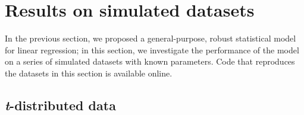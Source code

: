 \documentclass[fleqn,usenatbib]{mnras}
\begin{document}





\section{Results on simulated datasets}
\label{sec:results}

In the previous section, we proposed a general-purpose, robust statistical model
for linear regression; in this section, we investigate the performance of the
model on a series of simulated datasets with known parameters. Code that
reproduces the datasets in this section is available online\footnotemark.


\subsection{\textit{t}-distributed data}
\label{sec:results.t}
\end{document}
